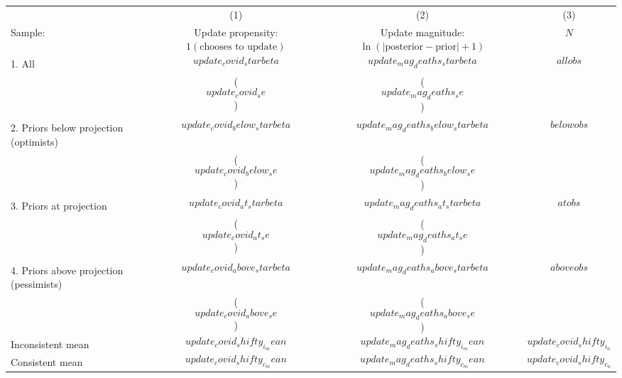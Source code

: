 \begin{tabular}{l c c c}
  \hline
  \hline
 & (1) & (2) & (3) \\ 
  Sample: & \shortstack{Update propensity: \\
  $1(\text{chooses to update})$} & \shortstack{Update magnitude: \\ $\ln(|\text{posterior} -
  \text{prior}|+1)$} & $N$ \\ 
  \hline  
1. All & $$update_covid_starbeta$$ & $$update_mag_deaths_starbeta$$ & $$allobs$$ \\
  & ($$update_covid_se$$) & ($$update_mag_deaths_se$$) \\
  \\
2. Priors below projection (optimists) & $$update_covid_below_starbeta$$
       & $$update_mag_deaths_below_starbeta$$ & 
 $$belowobs$$ \\
  & ($$update_covid_below_se$$) & ($$update_mag_deaths_below_se$$) \\
  \\
3. Priors at projection & $$update_covid_at_starbeta$$ & $$update_mag_deaths_at_starbeta$$
          & $$atobs$$ \\
  & ($$update_covid_at_se$$) & ($$update_mag_deaths_at_se$$) \\
  \\
4. Priors above projection (pessimists) & $$update_covid_above_starbeta$$ & $$update_mag_deaths_above_starbeta$$
          & $$aboveobs$$ \\
  & ($$update_covid_above_se$$) & ($$update_mag_deaths_above_se$$) \\
  \hline
  Inconsistent mean & $$update_covid_shifty_i_mean$$ & $$update_mag_deaths_shifty_i_mean$$
             & $$update_covid_shifty_i_n$$ \\
  Consistent mean & $$update_covid_shifty_c_mean$$
       & $$update_mag_deaths_shifty_c_mean$$
             & $$update_covid_shifty_c_n$$ \\
  \hline
  \hline
\end{tabular}


